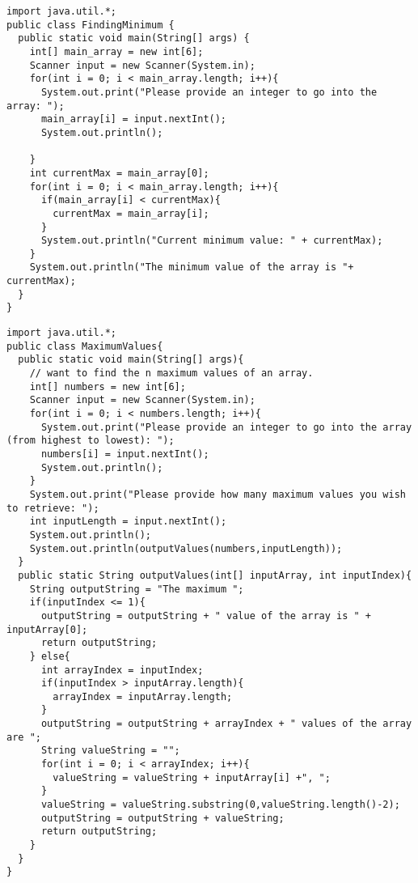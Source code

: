 \documentclass[10pt]{mypackage}
\begin{document}
  \begin{lstlisting}[style=javastyle,title=Finding Maximum Value in an Array]
import java.util.*;
public class FindingMinimum {
  public static void main(String[] args) {
    int[] main_array = new int[6];
    Scanner input = new Scanner(System.in);
    for(int i = 0; i < main_array.length; i++){
      System.out.print("Please provide an integer to go into the array: ");
      main_array[i] = input.nextInt();
      System.out.println();

    }
    int currentMax = main_array[0];
    for(int i = 0; i < main_array.length; i++){
      if(main_array[i] < currentMax){
        currentMax = main_array[i];
      }
      System.out.println("Current minimum value: " + currentMax);
    }
    System.out.println("The minimum value of the array is "+ currentMax);
  }
}
  \end{lstlisting}
  \begin{lstlisting}[style=javastyle,title=Finding the Maximum $n$ Values in an Array]
import java.util.*;
public class MaximumValues{
  public static void main(String[] args){
    // want to find the n maximum values of an array.
    int[] numbers = new int[6];
    Scanner input = new Scanner(System.in);
    for(int i = 0; i < numbers.length; i++){
      System.out.print("Please provide an integer to go into the array (from highest to lowest): ");
      numbers[i] = input.nextInt();
      System.out.println();
    }
    System.out.print("Please provide how many maximum values you wish to retrieve: ");
    int inputLength = input.nextInt();
    System.out.println();
    System.out.println(outputValues(numbers,inputLength));
  }
  public static String outputValues(int[] inputArray, int inputIndex){
    String outputString = "The maximum ";
    if(inputIndex <= 1){
      outputString = outputString + " value of the array is " + inputArray[0];
      return outputString;
    } else{
      int arrayIndex = inputIndex;
      if(inputIndex > inputArray.length){
        arrayIndex = inputArray.length;
      }
      outputString = outputString + arrayIndex + " values of the array are ";
      String valueString = "";
      for(int i = 0; i < arrayIndex; i++){
        valueString = valueString + inputArray[i] +", ";
      }
      valueString = valueString.substring(0,valueString.length()-2);
      outputString = outputString + valueString;
      return outputString;
    }
  }
}
  \end{lstlisting}
  
\end{document}
